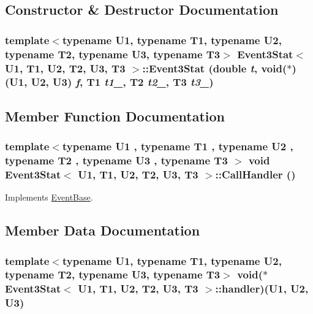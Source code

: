 \subsection{Constructor \& Destructor Documentation}
\hypertarget{classEvent3Stat_2bebf5183e80cc269d6282ea0569f8e0}{
\subsubsection[{Event3Stat}]{\setlength{\rightskip}{0pt plus 5cm}template$<$typename U1, typename T1, typename U2, typename T2, typename U3, typename T3$>$ {\bf Event3Stat}$<$ U1, T1, U2, T2, U3, T3 $>$::{\bf Event3Stat} (double {\em t}, \/  void($\ast$)(U1, U2, U3) {\em f}, \/  T1 {\em t1\_}, \/  T2 {\em t2\_}, \/  T3 {\em t3\_})}}
\label{classEvent3Stat_2bebf5183e80cc269d6282ea0569f8e0}




\subsection{Member Function Documentation}
\hypertarget{classEvent3Stat_6901cb7acfdb3f021edd0a79c1766349}{
\subsubsection[{CallHandler}]{\setlength{\rightskip}{0pt plus 5cm}template$<$typename U1 , typename T1 , typename U2 , typename T2 , typename U3 , typename T3 $>$ void {\bf Event3Stat}$<$ U1, T1, U2, T2, U3, T3 $>$::CallHandler ()}}
\label{classEvent3Stat_6901cb7acfdb3f021edd0a79c1766349}




Implements \hyperlink{classEventBase_121ca64dec88c8d9589c064b0060d037}{EventBase}.

\subsection{Member Data Documentation}
\hypertarget{classEvent3Stat_9a4bc9da2d5b2fac78aa4b01fc842218}{
\subsubsection[{handler}]{\setlength{\rightskip}{0pt plus 5cm}template$<$typename U1, typename T1, typename U2, typename T2, typename U3, typename T3$>$ void($\ast$ {\bf Event3Stat}$<$ U1, T1, U2, T2, U3, T3 $>$::{\bf handler})(U1, U2, U3)}}
\label{classEvent3Stat_9a4bc9da2d5b2fac78aa4b01fc842218}


